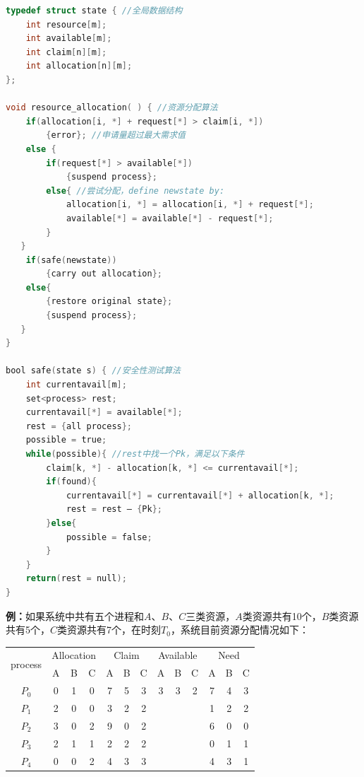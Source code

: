 \documentclass[cs4size,a4paper,10pt]{ctexart}
\begin{document}
	\begin{lstlisting}[language=C,keywordstyle=\color{black}]
typedef struct state { //全局数据结构
	int resource[m];
	int available[m];
	int claim[n][m];
	int allocation[n][m];
};

void resource_allocation( ) { //资源分配算法
   	if(allocation[i, *] + request[*] > claim[i, *])
    	{error}; //申请量超过最大需求值
	else {
    	if(request[*] > available[*])
    		{suspend process};
    	else{ //尝试分配，define newstate by:
        	allocation[i, *] = allocation[i, *] + request[*];
        	available[*] = available[*] - request[*];
      	}
   }
	if(safe(newstate))
		{carry out allocation};
	else{
		{restore original state};
		{suspend process};
   }
}

bool safe(state s) { //安全性测试算法
	int currentavail[m];
	set<process> rest;
	currentavail[*] = available[*];
	rest = {all process};
	possible = true;
	while(possible){ //rest中找一个Pk，满足以下条件
		claim[k, *] - allocation[k, *] <= currentavail[*];
		if(found){
			currentavail[*] = currentavail[*] + allocation[k, *];
			rest = rest – {Pk};
		}else{
			possible = false;
		}
	}
	return(rest = null);
}
	\end{lstlisting}

	\textbf{例：}如果系统中共有五个进程和$A$、$B$、$C$三类资源，$A$类资源共有10个，$B$类资源共有5个，$C$类资源共有7个，在时刻$T_0$，系统目前资源分配情况如下：

	\begin{table}[H]
	\centering
	\begin{tabular}{c|ccc|ccc|ccc|ccc}
	\hline
	\multirow{2}{*}{process} & \multicolumn{3}{c|}{Allocation} & \multicolumn{3}{c|}{Claim} & \multicolumn{3}{c|}{Available} & \multicolumn{3}{c}{Need} \\ \cline{2-13} 
							 & A         & B        & C        & A       & B       & C      & A        & B        & C        & A      & B      & C      \\ \hline
	$P_0$                    & 0         & 1        & 0        & 7       & 5       & 3      & 3        & 3        & 2        & 7      & 4      & 3      \\ \hline
	$P_1$                    & 2         & 0        & 0        & 3       & 2       & 2      &          &          &          & 1      & 2      & 2      \\ \hline
	$P_2$                    & 3         & 0        & 2        & 9       & 0       & 2      &          &          &          & 6      & 0      & 0      \\ \hline
	$P_3$                    & 2         & 1        & 1        & 2       & 2       & 2      &          &          &          & 0      & 1      & 1      \\ \hline
	$P_4$                    & 0         & 0        & 2        & 4       & 3       & 3      &          &          &          & 4      & 3      & 1      \\ \hline
	\end{tabular}
	\end{table}
\end{document}
